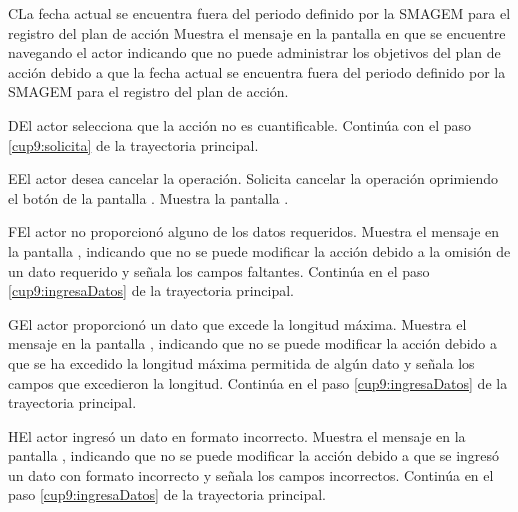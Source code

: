    \begin{UCtrayectoriaA}{C}{La fecha actual se encuentra fuera del periodo definido por la SMAGEM para el registro del plan de acción}
    \UCpaso[\UCsist] Muestra el mensaje  en la pantalla en que se encuentre navegando el actor indicando que no puede administrar los objetivos del plan de acción debido a que la fecha actual se encuentra fuera del periodo definido por la SMAGEM para el registro del plan de acción.
 \end{UCtrayectoriaA}


\begin{UCtrayectoriaA}{D}{El actor selecciona que la acción no es cuantificable.}
	\UCpaso[] Continúa con el paso \ref{cup9:solicita} de la trayectoria principal.
\end{UCtrayectoriaA} 


\begin{UCtrayectoriaA}{E}{El actor desea cancelar la operación.}
	\UCpaso[\UCactor] Solicita cancelar la operación oprimiendo el botón  de la pantalla .
	\UCpaso[\UCsist] Muestra la pantalla  .
\end{UCtrayectoriaA} 

\begin{UCtrayectoriaA}{F}{El actor no proporcionó alguno de los datos requeridos.}
	\UCpaso[\UCsist] Muestra el mensaje  en la pantalla  ,
	indicando que no se puede modificar la acción debido a la omisión de un dato requerido y señala los campos faltantes.
	\UCpaso[] Continúa en el paso \ref{cup9:ingresaDatos} de la trayectoria principal.
\end{UCtrayectoriaA}
 
\begin{UCtrayectoriaA}{G}{El actor proporcionó un dato que excede la longitud máxima.}
	\UCpaso[\UCsist] Muestra el mensaje  en la pantalla ,
	indicando que no se puede modificar la acción debido a que se ha excedido la longitud máxima permitida de algún dato y señala los campos que excedieron la longitud.
	\UCpaso[] Continúa en el paso \ref{cup9:ingresaDatos} de la trayectoria principal.
\end{UCtrayectoriaA}

\begin{UCtrayectoriaA}{H}{El actor ingresó un dato en formato incorrecto.}
	\UCpaso[\UCsist] Muestra el mensaje  en la pantalla ,
	indicando que no se puede modificar la acción debido a que se ingresó un dato con formato incorrecto y señala los campos incorrectos.
        \UCpaso[] Continúa en el paso \ref{cup9:ingresaDatos} de la trayectoria principal. 
  \end{UCtrayectoriaA}
 